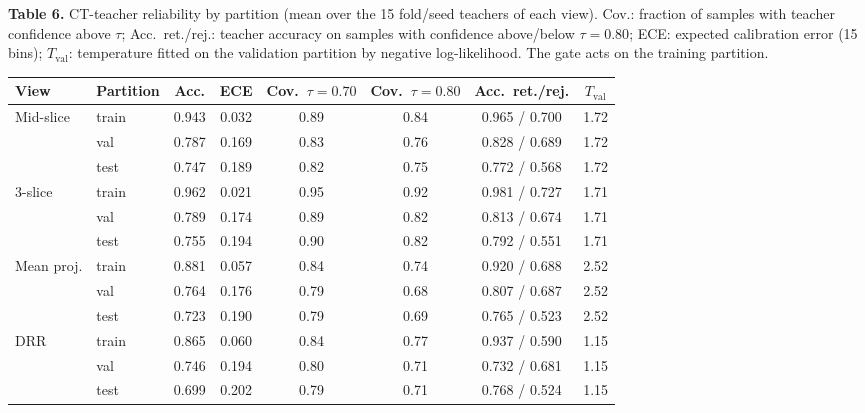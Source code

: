 \documentclass[pdflatex,sn-vancouver,Numbered]{sn-jnl}
\begin{document}
\begin{minipage}{\textwidth}
{\small\noindent\textbf{Table 6.} CT-teacher reliability by partition (mean over the 15 fold/seed teachers of each view). Cov.: fraction of samples with teacher confidence above $\tau$; Acc.\ ret./rej.: teacher accuracy on samples with confidence above/below $\tau{=}0.80$; ECE: expected calibration error (15 bins); $T_{\mathrm{val}}$: temperature fitted on the validation partition by negative log-likelihood. The gate acts on the training partition.\par}
\vspace{6pt}


\centering
\scriptsize
\setlength{\tabcolsep}{2.4pt}
\renewcommand{\arraystretch}{0.9}
\begin{tabular}{@{}llcccccc@{}}
\toprule
View & Partition & Acc. & ECE & Cov.\ $\tau{=}0.70$ & Cov.\ $\tau{=}0.80$ & Acc.\ ret./rej. & $T_{\mathrm{val}}$ \\
\midrule
Mid-slice & train & 0.943 & 0.032 & 0.89 & 0.84 & 0.965 / 0.700 & 1.72 \\
 & val & 0.787 & 0.169 & 0.83 & 0.76 & 0.828 / 0.689 & 1.72 \\
 & test & 0.747 & 0.189 & 0.82 & 0.75 & 0.772 / 0.568 & 1.72 \\
3-slice & train & 0.962 & 0.021 & 0.95 & 0.92 & 0.981 / 0.727 & 1.71 \\
 & val & 0.789 & 0.174 & 0.89 & 0.82 & 0.813 / 0.674 & 1.71 \\
 & test & 0.755 & 0.194 & 0.90 & 0.82 & 0.792 / 0.551 & 1.71 \\
Mean proj. & train & 0.881 & 0.057 & 0.84 & 0.74 & 0.920 / 0.688 & 2.52 \\
 & val & 0.764 & 0.176 & 0.79 & 0.68 & 0.807 / 0.687 & 2.52 \\
 & test & 0.723 & 0.190 & 0.79 & 0.69 & 0.765 / 0.523 & 2.52 \\
DRR & train & 0.865 & 0.060 & 0.84 & 0.77 & 0.937 / 0.590 & 1.15 \\
 & val & 0.746 & 0.194 & 0.80 & 0.71 & 0.732 / 0.681 & 1.15 \\
 & test & 0.699 & 0.202 & 0.79 & 0.71 & 0.768 / 0.524 & 1.15 \\
\bottomrule
\end{tabular}
\end{minipage}
\clearpage
\end{document}
